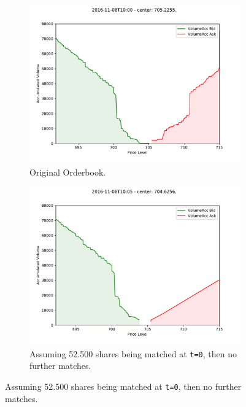 \begin{figure}[ht]
	\centering
	\begin{subfigure}[t]{0.3\textwidth}
        		\centering
        		\includegraphics[width=\textwidth]{content/drawings/masterbook_customstart_NoSim}
        		\caption{Original Orderbook.}
		\label{fig:differingmasterbooks:NoSim}
    	\end{subfigure}
	\begin{subfigure}[t]{0.3\textwidth}
        		\centering
        		\includegraphics[width=\textwidth]{content/drawings/masterbook_customstart_SimMarketOrder}
        		\caption{Assuming 52.500 shares being matched at \lstinline!t=0!, then no further matches.}
		\label{fig:differingmasterbooks:SimMarketOrder}

\end{subfigure}
\end{figure}
